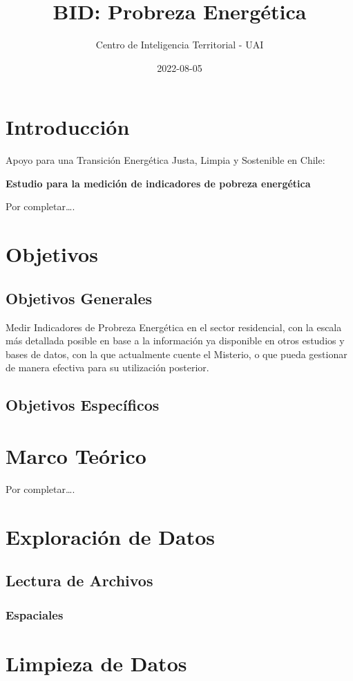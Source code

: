 \documentclass[
]{book}
\title{BID: Probreza Energética}
\author{Centro de Inteligencia Territorial - UAI}
\date{2022-08-05}
\begin{document}
\maketitle

{
\setcounter{tocdepth}{1}
\tableofcontents
}
\hypertarget{introducciuxf3n}{%
\chapter{Introducción}\label{introducciuxf3n}}

Apoyo para una Transición Energética Justa, Limpia y Sostenible en Chile:

\textbf{Estudio para la medición de indicadores de pobreza energética}

Por completar\ldots.

\hypertarget{objetivos}{%
\chapter{Objetivos}\label{objetivos}}

\hypertarget{objetivos-generales}{%
\section{Objetivos Generales}\label{objetivos-generales}}

Medir Indicadores de Probreza Energética en el sector residencial, con la escala más detallada posible en base a la información ya disponible en otros estudios y bases de datos, con la que actualmente cuente el Misterio, o que pueda gestionar de manera efectiva para su utilización posterior.

\hypertarget{objetivos-especuxedficos}{%
\section{Objetivos Específicos}\label{objetivos-especuxedficos}}

\hypertarget{m_teorico}{%
\chapter{Marco Teórico}\label{m_teorico}}

Por completar\ldots.

\hypertarget{data_explorer}{%
\chapter{Exploración de Datos}\label{data_explorer}}

\hypertarget{lectura-de-archivos}{%
\section{Lectura de Archivos}\label{lectura-de-archivos}}

\hypertarget{espaciales}{%
\subsection{Espaciales}\label{espaciales}}

\hypertarget{data_clean}{%
\chapter{Limpieza de Datos}\label{data_clean}}

  
\end{document}
